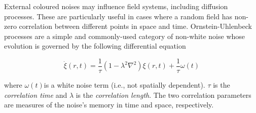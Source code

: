 External coloured noises may influence field systems, including diffusion processes. These are particularly useful in cases where a random field has non-zero correlation between different points in space and time. Ornstein-Uhlenbeck processes are a simple and commonly-used category of non-white noise whose evolution is governed by the following differential equation \cite{ojalvoColoredNoise}

\[\dot{\xi}(r,t) = \frac{1}{\tau}(1 - \lambda^{2}\nabla^{2})\xi(r,t) + \frac{1}{\tau}\omega(t)\]

where \(\omega(t)\)is a white noise term (i.e., not spatially dependent). \(\tau\) is the \emph{correlation time} and \(\lambda\) is the \emph{correlation length}. The two correlation parameters are measures of the noise's memory in time and space, respectively.